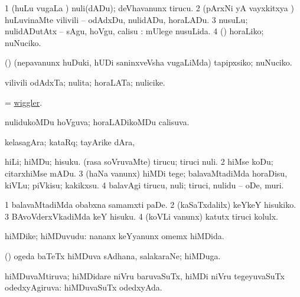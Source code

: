 \noindent
\gl{\akirx}
\expl{}
\bmng
\bnum
\num{1} (huLu \mo vugaLa \vi) nuli(dADu); deVhavanunx tirucu. 
\num{2} (pArxNi yA vayxkitxya \vi) huLuvinaMte vilivili -- odAdxDu, nulidADu, horaLADu. 
\num{3} nusuLu; nulidADutAtx -- sAgu, hoVgu, calisu :  mUlege nusuLida. 
\num{4} (\rUpa) horaLiko; nuNuciko. 
\enum
\emng

\noindent
\gl{\pagu}
\expl{}
\bmng
{} (\AmA) (nepavanunx huDuki, hUDi saninxveVsha \mo vugaLiMda) tapipxsiko; nuNuciko. 
\emng
\eentry

\bentry
{} 
\gl{\nA}
\expl{}
\bmng
vilivili odAdxTa; nulita; horaLATa; nulicike. 
\emng
\eentry

\bentry
{} 
\gl{\nA}
\expl{}
\bmng
= \hyperlink{wiggler}{wiggler}. 
\emng
\eentry

\bentry
{} 
\gl{\gu}
\expl{}
\bmng
nulidukoMDu hoVguva; horaLADikoMDu calisuva. 
\emng
\eentry

\bentry
{} 
\gl{\nA}
\expl{}
\bmng
kelasagAra; kataRq; tayArike dAra, \udA\  
\emng
\eentry

\bentry
{} 
\gl{\sakirx}
\bmng
\bnum
{} 
\banum
{} hiLi; hiMDu; hisuku. 
 (rasa soVruvaMte) tirucu; tiruci nuli. 
\eanum
\numie
\num{2} hiMse koDu; citarxhiMse mADu. 
\num{3} (haNa \mo vanunx) hiMDi tege; balavaMtadiMda horaDisu, kiVLu; piVkisu; kakikxsu. 
\num{4} balavAgi tirucu, nuli; tiruci, nulidu -- oDe, muri. 
\enum
\emng

\noindent
\gl{\pagu}
\expl{}
\bmng
\bnum
\num{1}  balavaMtadiMda obabxna samamxti paDe. 
\num{2}  (kaSaTxdalilx) keYkeY hisukiko. 
\num{3}  BAvoVderxVkadiMda keY hisuku. 
\num{4}  (koVLi \mo vanunx) katutx tiruci kolulx. 
\enum
\emng
\eentry

\bentry
{} 
\gl{\nA}
\expl{}
\bmng
hiMDike; hiMDuvudu:  nananx keYyanunx omemx hiMDida. 
\emng
\eentry

\bentry
{} 
\gl{\nA}
\expl{}
\bmng
(\kanmu) ogeda baTeTx hiMDuva sAdhana, salakaraNe; hiMDuga. 
\emng
\eentry

\bentry
{} 
\gl{\gu}
\expl{}
\bmng
hiMDuvaMtiruva; hiMDidare niVru baruvaSuTx, hiMDi niVru tegeyuvaSuTx odedxyAgiruva:  hiMDuvaSuTx odedxyAda. 
\emng
\eentry

